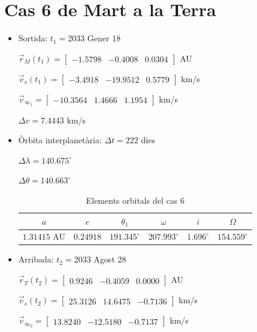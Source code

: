\section{Cas 6 de Mart a la Terra}
\begin{itemize}
	\item Sortida: $t_{1}=$2033 Gener 18

$\vec{r}_{M}(t_{1})=\begin{bmatrix}-1.5798 & -0.4008 & 0.0304\end{bmatrix}$ AU

$\vec{v}_{s}(t_{1})=\begin{bmatrix}-3.4918 & -19.9512 & 0.5779\end{bmatrix}$ km/s

$\vec{v}_{\infty_{1}}= \begin{bmatrix}-10.3564 & 1.4666 & 1.1954\end{bmatrix}$ km/s

$\Delta v=7.4443$ km/s

	\item Òrbita interplanetària: $\Delta t=222$ dies

$\Delta\lambda=140.675^{\circ}$

$\Delta\theta=140.663^{\circ}$
\begin{table}[h!]
	\centering
	\begin{tabular}{ |c|c|c|c|c|c|}
		\hline
		$a$ & $e$ & $\theta_{1}$ & $\omega$ & $i$ & $\Omega$ \\ \hline
		$1.31415$ AU  & $0.24918$ & $191.345^{\circ}$ & $207.993^{\circ}$ & $1.696^{\circ}$ & $154.559^{\circ}$ \\ \hline
	\end{tabular}
	\caption{Elements orbitals del cas 6}
\end{table}

	\item Arribada: $t_{2}=$2033 Agost 28

$\vec{r}_{T}(t_{2})=\begin{bmatrix}0.9246 & -0.4059 & 0.0000\end{bmatrix}$ AU

$\vec{v}_{s}(t_{2})=\begin{bmatrix}25.3126 & 14.6475 & -0.7136\end{bmatrix}$ km/s


$\vec{v}_{\infty_{2}}=\begin{bmatrix}13.8240 & -12.5180 & -0.7137\end{bmatrix}$ km/s
\end{itemize}
